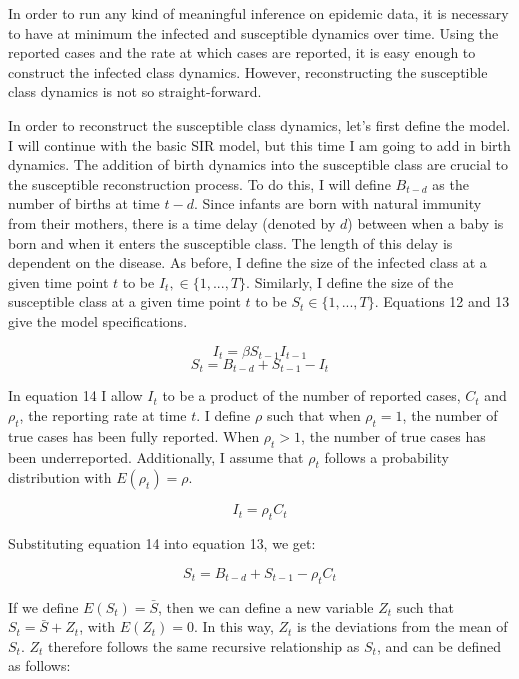 \documentclass{article}
\begin{document}
In order to run any kind of meaningful inference on epidemic data, it is necessary to have at minimum the infected and susceptible dynamics over time. Using the reported cases and the rate at which cases are reported, it is easy enough to construct the infected class dynamics. However, reconstructing the susceptible class dynamics is not so straight-forward. 

In order to reconstruct the susceptible class dynamics, let's first define the model. I will continue with the basic SIR model, but this time I am going to add in birth dynamics. The addition of birth dynamics into the susceptible class are crucial to the susceptible reconstruction process. To do this, I will define $B_{t-d}$ as the number of births at time $t-d$. Since infants are born with natural immunity from their mothers, there is a time delay (denoted by $d$) between when a baby is born and when it enters the susceptible class. The length of this delay is dependent on the disease. As before, I define the size of the infected class at a given time point $t$ to be $I_{t}, \in{\{1,...,T\}}$. Similarly, I define the size of the susceptible class at a given time point $t$ to be $S_{t} \in{\{1,...,T\}}$. Equations 12 and 13 give the model specifications. 

\begin{equation}
I_{t} = \beta S_{t-1} I_{t-1}
\end{equation}
\begin{equation}
S_{t} = B_{t-d} + S_{t-1} - I_{t}
\end{equation}

In equation 14 I allow $I_{t}$ to be a product of the number of reported cases, $C_{t}$ and $\rho_{t}$, the reporting rate at time $t$. I define $\rho$ such that when $\rho_{t} =1$, the number of true cases has been fully reported. When $\rho_{t} > 1$, the number of true cases has been underreported. Additionally, I assume that $\rho_{t}$ follows a probability distribution with  $E(\rho_{t}) = \rho$.

\begin{equation}
I_{t} = \rho_{t}C_{t}
\end{equation}

Substituting equation 14 into equation 13, we get: 

\begin{equation}
S_{t} = B_{t-d} + S_{t-1} -  \rho_{t} C_{t}
\end{equation}

If we define $E(S_{t})=\bar{S}$, then we can define a new variable $Z_{t}$ such that $S_{t} = \bar{S} + Z_{t}$, with $E(Z_{t})=0$. In this way, $Z_{t}$ is the deviations from the mean of $S_{t}$. $Z_{t}$ therefore follows the same recursive relationship as $S_{t}$, and can be defined as follows:
\end{document}

